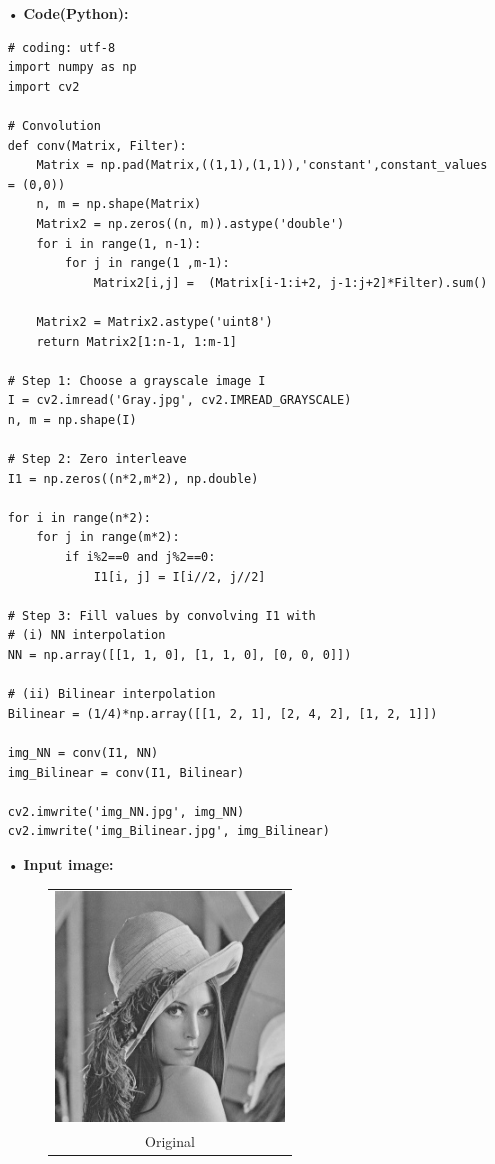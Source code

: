 \documentclass[12pt,a4paper]{article}
\begin{document}
\begin{enumerate}
\item[•]
{\bf Code(Python):}
\begin{lstlisting}
# coding: utf-8
import numpy as np
import cv2
    
# Convolution
def conv(Matrix, Filter):
    Matrix = np.pad(Matrix,((1,1),(1,1)),'constant',constant_values = (0,0))
    n, m = np.shape(Matrix)
    Matrix2 = np.zeros((n, m)).astype('double')
    for i in range(1, n-1):
        for j in range(1 ,m-1):
            Matrix2[i,j] =  (Matrix[i-1:i+2, j-1:j+2]*Filter).sum()

    Matrix2 = Matrix2.astype('uint8')
    return Matrix2[1:n-1, 1:m-1]

# Step 1: Choose a grayscale image I
I = cv2.imread('Gray.jpg', cv2.IMREAD_GRAYSCALE)
n, m = np.shape(I)

# Step 2: Zero interleave
I1 = np.zeros((n*2,m*2), np.double)

for i in range(n*2):
    for j in range(m*2):
        if i%2==0 and j%2==0:
            I1[i, j] = I[i//2, j//2]
            
# Step 3: Fill values by convolving I1 with
# (i) NN interpolation
NN = np.array([[1, 1, 0], [1, 1, 0], [0, 0, 0]])

# (ii) Bilinear interpolation
Bilinear = (1/4)*np.array([[1, 2, 1], [2, 4, 2], [1, 2, 1]])

img_NN = conv(I1, NN)
img_Bilinear = conv(I1, Bilinear)

cv2.imwrite('img_NN.jpg', img_NN)
cv2.imwrite('img_Bilinear.jpg', img_Bilinear)

\end{lstlisting}

\item[•]
{\bf Input image:}\\
\begin{figure}[h]
\hspace*{11em}
\begin{tabular}{c}
\includegraphics[height=2.4in]{Gray.jpg}\\
Original
\end{tabular}
\end{figure}


\end{enumerate}
\end{document}
